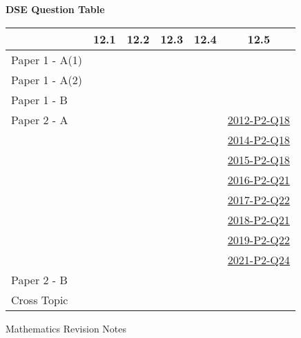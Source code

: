 \documentclass[12pt, a4paper]{article}
\begin{document}
\begin{absolutelynopagebreak}
\begin{center}
\textbf{DSE Question Table}
\end{center}
\begin{center}
\begin{tabular}{|l|c|c|c|c|c|}
\hline
        & 12.1 & 12.2 & 12.3 & 12.4 & 12.5 \\\hline
\hline
Paper 1 - A(1)&  &  &  &  &  \\
\hline
Paper 1 - A(2)&  &  &  &  &  \\
\hline
Paper 1 - B&  &  &  &  &  \\
\hline
\hline
Paper 2 - A&  &  &  &  & \hyperref[DSE2012-CoreP2-Q18]{2012-P2-Q18} \\
&  &  &  &  & \hyperref[DSE2014-CoreP2-Q18]{2014-P2-Q18} \\
&  &  &  &  & \hyperref[DSE2015-CoreP2-Q18]{2015-P2-Q18} \\
&  &  &  &  & \hyperref[DSE2016-CoreP2-Q21]{2016-P2-Q21} \\
&  &  &  &  & \hyperref[DSE2017-CoreP2-Q22]{2017-P2-Q22} \\
&  &  &  &  & \hyperref[DSE2018-CoreP2-Q21]{2018-P2-Q21} \\
&  &  &  &  & \hyperref[DSE2019-CoreP2-Q22]{2019-P2-Q22} \\
&  &  &  &  & \hyperref[DSE2021-CoreP2-Q24]{2021-P2-Q24} \\
\hline
Paper 2 - B&  &  &  &  &  \\
\hline
\hline
Cross Topic&  &  &  &  &  \\
\hline
\end{tabular}
\end{center}
\end{absolutelynopagebreak}
\newpage
\newpage
\thispagestyle{empty}
\begin{center}
Mathematics Revision Notes\\\vspace{1cm}
\greybox{\fontsize{24pt}{24pt}\selectfont {S3 Chapters}} \\\vspace{1cm}
\end{center}
\vspace{0.5cm}
\hline
\end{document}
